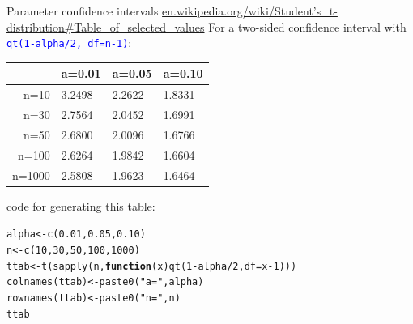 \documentclass[xcolor=table,           xcolor=dvipsnames]{beamer}\usepackage[]{graphicx}\usepackage[]{color}
\makeatletter
\newcommand{\hlnum}[1]{\textcolor[rgb]{0,0,0}{#1}}
\newcommand{\hlstr}[1]{\textcolor[rgb]{0.545,0.137,0.137}{#1}}
\newcommand{\hlopt}[1]{\textcolor[rgb]{0,0,0}{#1}}
\newcommand{\hlstd}[1]{\textcolor[rgb]{0,0,0}{#1}}
\newcommand{\hlkwa}[1]{\textcolor[rgb]{1,0,0}{\textbf{#1}}}
\newcommand{\hlkwb}[1]{\textcolor[rgb]{0,0,0}{#1}}
\newcommand{\hlkwc}[1]{\textcolor[rgb]{1,0,1}{#1}}
\newcommand{\hlkwd}[1]{\textcolor[rgb]{0,0,1}{#1}}
\newenvironment{kframe}{%
 \def\at@end@of@kframe{}%
 \ifinner\ifhmode%
  \def\at@end@of@kframe{\end{minipage}}%
  \begin{minipage}{\columnwidth}%
 \fi\fi%
 \def\FrameCommand##1{\hskip\@totalleftmargin \hskip-\fboxsep
 \colorbox{shadecolor}{##1}\hskip-\fboxsep
     \hskip-\linewidth \hskip-\@totalleftmargin \hskip\columnwidth}%
 \MakeFramed {\advance\hsize-\width
   \@totalleftmargin\z@ \linewidth\hsize
   \@setminipage}}%
 {\par\unskip\endMakeFramed%
 \at@end@of@kframe}
\newenvironment{knitrout}{}{} %
\newcommand{\rcode}[1]{\texttt{\textcolor{Blue}{#1}}} %
\makeatother
\begin{document}
\begin{frame}[fragile]{Parameter confidence intervals}
\href{http://en.wikipedia.org/wiki/Student\%27s_t-distribution\#Table_of_selected_values}{en.wikipedia.org/wiki/Student's\_t-distribution\#Table\_of\_selected\_values}
For a two-sided confidence interval with \rcode{qt(1-alpha/2,  df=n-1)}:
\begin{center}
\begin{tabular}{| r | l | l | l |}   \hline
       & a=0.01 & a=0.05 & a=0.10 \\ \hline \hline
n=10   & 3.2498 & 2.2622 & 1.8331 \\ \hline
n=30   & 2.7564 & 2.0452 & 1.6991 \\ \hline
n=50   & 2.6800 & 2.0096 & 1.6766 \\ \hline
n=100  & 2.6264 & 1.9842 & 1.6604 \\ \hline
n=1000 & 2.5808 & 1.9623 & 1.6464 \\ \hline
\end{tabular}
\end{center}
code for generating this table:
\begin{knitrout}\small
{}\color{fgcolor}\begin{kframe}
\begin{alltt}
\hlstd{alpha} \hlkwb{<-} \hlkwd{c}\hlstd{(}\hlnum{0.01}\hlstd{,} \hlnum{0.05}\hlstd{,} \hlnum{0.10}\hlstd{)}
\hlstd{n} \hlkwb{<-} \hlkwd{c}\hlstd{(}\hlnum{10}\hlstd{,} \hlnum{30}\hlstd{,} \hlnum{50}\hlstd{,} \hlnum{100}\hlstd{,} \hlnum{1000}\hlstd{)}
\hlstd{ttab} \hlkwb{<-} \hlkwd{t}\hlstd{(}\hlkwd{sapply}\hlstd{(n,} \hlkwa{function}\hlstd{(}\hlkwc{x}\hlstd{)} \hlkwd{qt}\hlstd{(}\hlnum{1}\hlopt{-}\hlstd{alpha}\hlopt{/}\hlnum{2} \hlstd{,}\hlkwc{df}\hlstd{=x}\hlopt{-}\hlnum{1}\hlstd{)))}
\hlkwd{colnames}\hlstd{(ttab)} \hlkwb{<-} \hlkwd{paste0}\hlstd{(}\hlstr{"a="}\hlstd{,alpha)}
\hlkwd{rownames}\hlstd{(ttab)} \hlkwb{<-} \hlkwd{paste0}\hlstd{(}\hlstr{"n="}\hlstd{,n)}
\hlstd{ttab}
\end{alltt}
\end{kframe}
\end{knitrout}
\end{frame}

\end{document}
